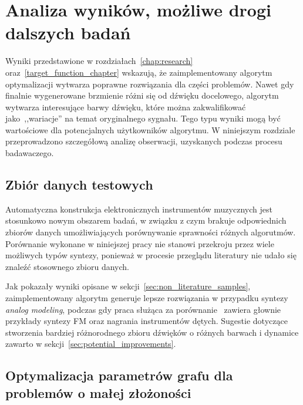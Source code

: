 \chapter{Analiza wyników, możliwe drogi dalszych badań}\label{chap:results_analysis}



Wyniki przedstawione w rozdziałach~\ref{chap:research} oraz~\ref{target_function_chapter}
wskazują, że zaimplementowany algorytm optymalizacji wytwarza poprawne rozwiązania
dla części problemów. Nawet gdy finalnie wygenerowane brzmienie różni
się od dźwięku docelowego, algorytm wytwarza interesujące barwy dźwięku,
które można zakwalifikować jako~,,wariacje'' na temat oryginalnego sygnału.
Tego typu wyniki mogą być wartościowe dla potencjalnych użytkowników algorytmu.
W niniejszym rozdziale przeprowadzono szczegółową analizę obserwacji,
uzyskanych podczas procesu badawaczego.


\section{Zbiór danych testowych}\label{sec:not_enough_benchmarking_data}

Automatyczna konstrukcja elektronicznych instrumentów muzycznych jest stosunkowo
nowym obszarem badań, w związku z czym brakuje odpowiednich zbiorów danych
umożliwiających porównywanie sprawności różnych algorutmów.
Porównanie wykonane w niniejszej pracy nie stanowi przekroju
przez wiele możliwych typów syntezy, ponieważ w procesie przeglądu
literatury nie udało się znaleźć stosownego zbioru danych.

Jak pokazały wyniki opisane w sekcji~\ref{sec:non_literature_samples},
zaimplementowany algorytm generuje lepsze rozwiązania w przypadku
syntezy \textit{analog modeling}, podczas gdy praca służąca
za porównanie~\cite{evolutionary_puredata} zawiera głownie przykłady
syntezy FM oraz nagrania instrumentów dętych. Sugestie dotyczące
stworzenia bardziej różnorodnego zbioru dźwięków o różnych barwach
i dynamice zawarto w sekcji~\ref{sec:potential_improvements}.


\section{Optymalizacja parametrów grafu dla problemów o małej złożoności}


